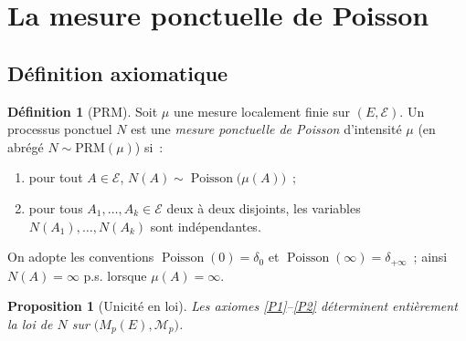 \documentclass[11pt,a4paper]{article}
\theoremstyle{plain}
\newtheorem{proposition}[theoreme]{Proposition}
\theoremstyle{definition}
\newtheorem{definition}[theoreme]{Définition}
\newcommand{\Poi}{\operatorname{Poisson}}
\newcommand{\Mp}{M_p}
\newcommand{\calE}{\mathcal{E}}
\newcommand{\calM}{\mathcal{M}}
\begin{document}
\section{La mesure ponctuelle de Poisson}

\subsection{Définition axiomatique}

\begin{definition}[PRM]\label{def:prm}
Soit $\mu$ une mesure localement finie sur $(E,\calE)$. Un processus ponctuel $N$ est une \emph{mesure ponctuelle de Poisson} d'intensité $\mu$ (en abrégé $N\sim\mathrm{PRM}(\mu)$) si~:
\begin{enumerate}[label=\textup{(P\arabic*)}]
\item\label{P1} pour tout $A\in\calE$, $N(A)\sim\Poi\big(\mu(A)\big)$~;
\item\label{P2} pour tous $A_1,\dots,A_k\in\calE$ deux à deux disjoints, les variables $N(A_1),\dots,N(A_k)$ sont indépendantes.
\end{enumerate}
On adopte les conventions $\Poi(0)=\delta_0$ et $\Poi(\infty)=\delta_{+\infty}$~; ainsi $N(A)=\infty$ p.s. lorsque $\mu(A)=\infty$.
\end{definition}

\begin{proposition}[Unicité en loi]\label{prop:unicite}
Les axiomes \ref{P1}--\ref{P2} déterminent entièrement la loi de $N$ sur $\big(\Mp(E),\calM_p\big)$.
\end{proposition}
\end{document}
